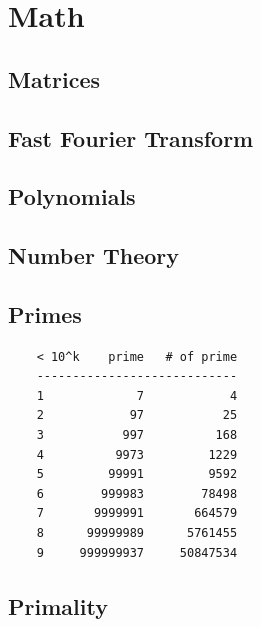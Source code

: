 \chapter{Math}

\section{Matrices}

\section{Fast Fourier Transform}

\section{Polynomials}

\section{Number Theory}

\section{Primes}
    \begin{verbatim}
    < 10^k    prime   # of prime
    ----------------------------
    1             7            4
    2            97           25
    3           997          168
    4          9973         1229
    5         99991         9592
    6        999983        78498
    7       9999991       664579
    8      99999989      5761455
    9     999999937     50847534
    \end{verbatim}

\section{Primality}
